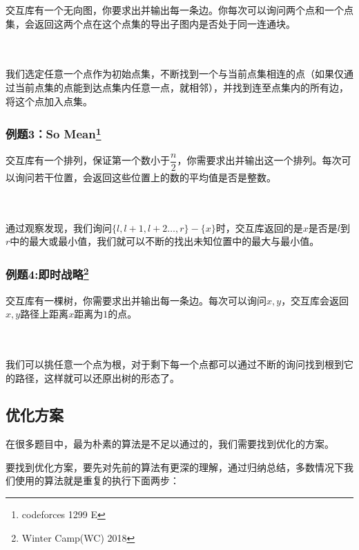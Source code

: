 \documentclass{noithesis}
\begin{document}
交互库有一个无向图，你要求出并输出每一条边。你每次可以询问两个点和一个点集，会返回这两个点在这个点集的导出子图内是否处于同一连通块。

\paragraph{}\

我们选定任意一个点作为初始点集，不断找到一个与当前点集相连的点（如果仅通过当前点集的点能到达点集内任意一点，就相邻），并找到连至点集内的所有边，将这个点加入点集。

\subsubsection{例题3：So Mean\footnote{codeforces 1299 E}}

交互库有一个排列，保证第一个数小于$\dfrac n2$，你需要求出并输出这一个排列。每次可以询问若干位置，会返回这些位置上的数的平均值是否是整数。

\paragraph{}\

通过观察发现，我们询问$\{l,l+1,l+2\dots,r\}-\{x\}$时，交互库返回的是$x$是否是$l$到$r$中的最大或最小值，我们就可以不断的找出未知位置中的最大与最小值。

\subsubsection{例题4:即时战略\footnote{Winter Camp(WC) 2018}}

交互库有一棵树，你需要求出并输出每一条边。每次可以询问$x,y$，交互库会返回$x,y$路径上距离$x$距离为$1$的点。

\paragraph{}\

我们可以挑任意一个点为根，对于剩下每一个点都可以通过不断的询问找到根到它的路径，这样就可以还原出树的形态了。

\subsection{优化方案}

在很多题目中，最为朴素的算法是不足以通过的，我们需要找到优化的方案。

要找到优化方案，要先对先前的算法有更深的理解，通过归纳总结，多数情况下我们使用的算法就是重复的执行下面两步：
\end{document}
